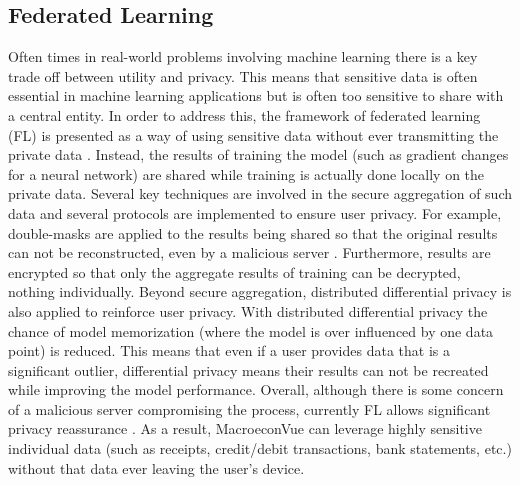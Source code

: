 \documentclass[conference]{IEEEtran}
\begin{document}
\subsection{Federated Learning}
Often times in real-world problems involving machine learning there is a key trade off between utility and privacy. This means that sensitive data is often essential in machine learning applications but is often too sensitive to share with a central entity. In order to address this, the framework of federated learning (FL) is presented as a way of using sensitive data without ever transmitting the private data \cite{agg_fl}. Instead, the results of training the model (such as gradient changes for a neural network) are shared while training is actually done locally on the private data. Several key techniques are involved in the secure aggregation of such data and several protocols are implemented to ensure user privacy. For example, double-masks are applied to the results being shared so that the original results can not be reconstructed, even by a malicious server \cite{agg_fl}. Furthermore, results are encrypted so that only the aggregate results of training can be decrypted, nothing individually. Beyond secure aggregation, distributed differential privacy is also applied to reinforce user privacy. With distributed differential privacy the chance of model memorization (where the model is over influenced by one data point) is reduced. This means that even if a user provides data that is a significant outlier, differential privacy means their results can not be recreated while improving the model performance. Overall, although there is some concern of a malicious server compromising the process, currently FL allows significant privacy reassurance \cite{privacy_fl}. As a result, MacroeconVue can leverage highly sensitive individual data (such as receipts, credit/debit transactions, bank statements, etc.) without that data ever leaving the user's device.
\end{document}
